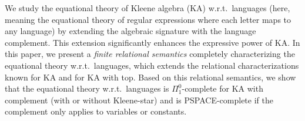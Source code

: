 We study the equational theory of Kleene algebra (KA) w.r.t.\ languages (here, meaning the equational theory of regular expressions where each letter maps to any language) by extending the algebraic signature with the language complement.
This extension significantly enhances the expressive power of KA.
In this paper, we present a \emph{finite relational semantics} completely characterizing the equational theory w.r.t.\ languages,
which extends the relational characterizations known for KA and for KA with top.
Based on this relational semantics, we show that the equational theory w.r.t.\ languages is $\Pi^{0}_{1}$-complete for KA with complement (with or without Kleene-star) and is PSPACE-complete if the complement only applies to variables or constants.
